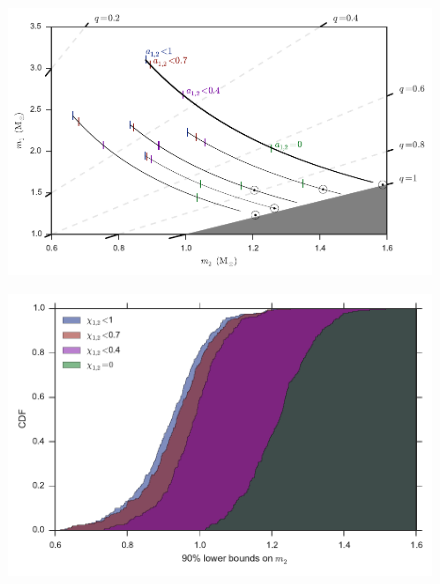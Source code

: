 \documentclass[iop,apj,twocolumn,twocolappendix,numberedappendix]{emulateapj}
\begin{document}


\begin{figure}
  \centering
  \includegraphics[width=1.0\columnwidth]{figures/compmasses/mass_boxes}
  \caption{\protect} 
\end{figure}



\begin{figure}
  \centering
  \includegraphics[width=0.95\columnwidth]{figures/mass-ratio/m2_cumulatives}
  \caption{\protect} 
\end{figure}


\end{document}
